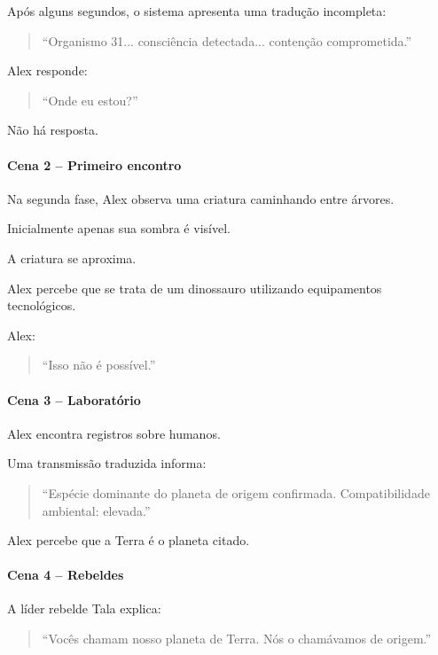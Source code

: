 \documentclass[12pt,a4paper]{article}
\begin{document}
Após alguns segundos, o sistema apresenta uma tradução incompleta:

\begin{quote}
``Organismo 31... consciência detectada... contenção comprometida.''
\end{quote}

Alex responde:

\begin{quote}
``Onde eu estou?''
\end{quote}

Não há resposta.

\paragraph{Cena 2 -- Primeiro encontro}

Na segunda fase, Alex observa uma criatura caminhando entre árvores.

Inicialmente apenas sua sombra é visível.

A criatura se aproxima.

Alex percebe que se trata de um dinossauro utilizando equipamentos
tecnológicos.

Alex:

\begin{quote}
``Isso não é possível.''
\end{quote}

\paragraph{Cena 3 -- Laboratório}

Alex encontra registros sobre humanos.

Uma transmissão traduzida informa:

\begin{quote}
``Espécie dominante do planeta de origem confirmada.
Compatibilidade ambiental: elevada.''
\end{quote}

Alex percebe que a Terra é o planeta citado.

\paragraph{Cena 4 -- Rebeldes}

A líder rebelde Tala explica:

\begin{quote}
``Vocês chamam nosso planeta de Terra. Nós o chamávamos de origem.''
\end{quote}
\end{document}
